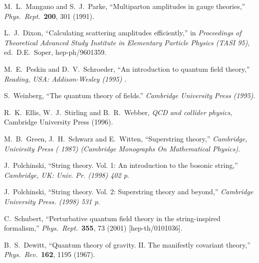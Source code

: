 \begin{thebibliography}{99}
M.~L.~Mangano and S.~J.~Parke,
``Multiparton amplitudes in gauge theories,''
{\it Phys.\ Rept.}\  {\bf 200}, 301 (1991).

L.~J.~Dixon,
``Calculating scattering amplitudes efficiently,''
in {\it Proceedings of Theoretical Advanced Study Institute
in Elementary Particle Physics (TASI 95)}, ed.\ D.E.\ Soper,
hep-ph/9601359.

M.~E.~Peskin and D.~V.~Schroeder,
``An introduction to quantum field theory,''
{\it  Reading, USA: Addison-Wesley (1995) }.

S.~Weinberg,
``The quantum theory of fields.''
{\it  Cambridge University Press (1995)}.

R.~K.~Ellis, W.~J.~Stirling and B.~R.~Webber, 
{\it QCD and collider physics}, Cambridge University Press (1996).

M.~B.~Green, J.~H.~Schwarz and E.~Witten,
``Superstring theory,''
{\it  Cambridge, Univirsity Press ( 1987)  
(Cambridge Monographs On Mathematical Physics)}.

J.~Polchinski,
``String theory. Vol. 1: An introduction to the bosonic string,''
{\it  Cambridge, UK: Univ. Pr. (1998) 402 p}.

J.~Polchinski,
``String theory. Vol. 2: Superstring theory and beyond,''
{\it  Cambridge University Press. (1998) 531 p}.

C.~Schubert,
``Perturbative quantum field theory in the string-inspired formalism,''
{\it Phys.\ Rept.}\  {\bf 355}, 73 (2001)
[hep-th/0101036].

B.~S.~Dewitt,
``Quantum theory of gravity. II. The manifestly covariant theory,''
{\it Phys.\ Rev.}\  {\bf 162}, 1195 (1967).


\end{thebibliography}
